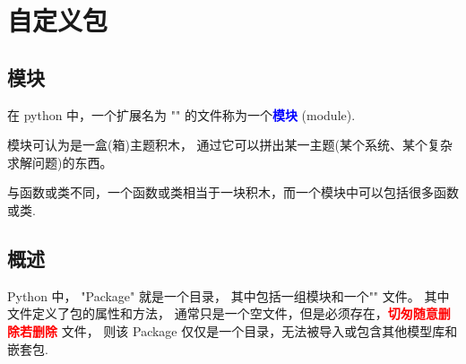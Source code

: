 \chapter{自定义包}

\section{模块}
在 python 中，一个扩展名为 "" 的文件称为一个\textcolor{blue}{\textbf{模块}} (module). 

模块可认为是一盒(箱)主题积木，
通过它可以拼出某一主题(某个系统、某个复杂求解问题)的东西。

与函数或类不同，一个函数或类相当于一块积木，而一个模块中可以包括很多函数或类.


\section{概述}
Python 中， "Package" 就是一个目录，
其中包括一组模块和一个"" 文件。
其中  文件定义了包的属性和方法，
通常只是一个空文件，但是必须存在，\textcolor{red}{\textbf{切匆随意删除若删除}}  文件，
则该 Package 仅仅是一个目录，无法被导入或包含其他模型库和嵌套包.


